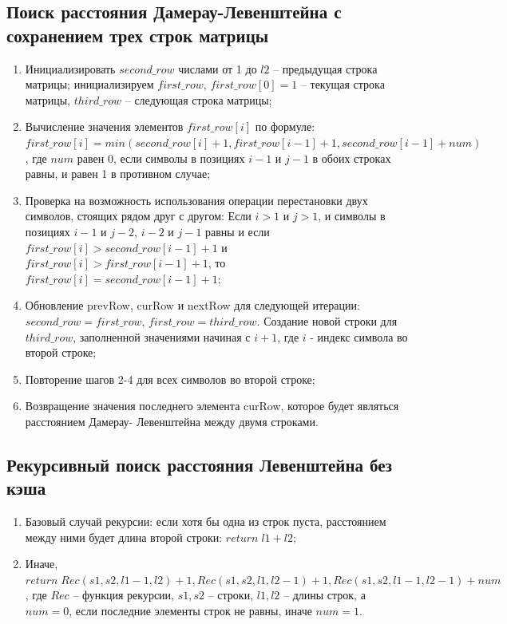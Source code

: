 \documentclass[12pt, a4paper]{article}
\begin{document}
\subsection{Поиск расстояния  Дамерау-Левенштейна с 
  сохранением трех строк матрицы}   
\begin{enumerate}
  \item Инициализировать $second\_row$ числами от 1 
  до $l2$ -- предыдущая строка матрицы; 
  инициализируем $first\_row$, $first\_row[0]=1$ -- 
  текущая строка матрицы,  $third\_row$ -- следующая 
  строка матрицы;
  \item Вычисление значения элементов $first\_row[i]$ 
  по формуле: $first\_row[i] = min(second\_row[i] + 1, 
  first\_row[i-1] + 1, second\_row[i-1] + num)$, где 
  $num$ равен 0, если символы в позициях $i-1 $ и 
  $j-1$ в обоих строках равны, и равен 1 в противном 
  случае;
  \item Проверка на возможность использования 
  операции перестановки двух символов, стоящих рядом 
  друг с другом:
  Если $i > 1$ и $j > 1$, и символы в позициях $i-1$ 
  и $j-2$, $i-2$ и $j-1$ равны и если $first\_row[i] > 
  second\_row[i-1] + 1$ и $first\_row[i] > 
  first\_row[i-1] + 1$, то $first\_row[i] =
  second\_row[i-1] + 1$;
  \item Обновление prevRow, curRow и nextRow для 
  следующей итерации: $second\_row = first\_row$, 
  $first\_row = third\_row$. Создание новой строки для 
  $third\_row$, заполненной значениями начиная с $i + 
  1$, где $i$ - индекс символа во второй строке;
  \item Повторение шагов 2-4 для всех символов во 
  второй строке;
  \item Возвращение значения последнего элемента
  curRow, которое будет являться расстоянием Дамерау-
  Левенштейна между двумя строками.
\end{enumerate}
\subsection{Рекурсивный поиск расстояния Левенштейна 
без кэша}
\begin{enumerate}
	\item Базовый случай рекурсии: если хотя бы одна 
	из строк пуста, расстоянием между ними будет длина 
	второй строки: $return\;l1 + l2$;
	\item Иначе, $return\;Rec(s1, s2, l1 - 1, l2) + 1, 
    Rec(s1, s2, l1, l2 - 1) + 1, Rec(s1, s2, l1 - 1, 
    l2 - 1) + num$, где $Rec$ -- функция рекурсии, 
    $s1, s2$ -- строки, $l1, l2$ -- длины строк, а 
    $num = 0$, если последние элементы строк не равны, 
    иначе $num = 1$.
\end{enumerate}
\newpage
\end{document}
